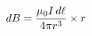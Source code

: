 \documentclass[preview]{standalone}
\begin{document}
\begin{align*}
dB = {\mu_0 I \, d\ell \over 4\pi r^3} \times r
\end{align*}
\end{document}
